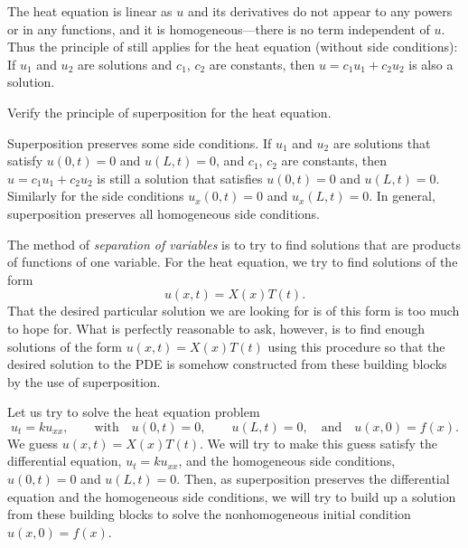 The heat equation is linear as $u$ and its derivatives do not
appear to any powers or in any functions,
and it is homogeneous---there is no term independent of $u$.
Thus the principle of  still applies for
the heat equation
(without side conditions):
If $u_1$ and $u_2$ are
solutions and $c_1$, $c_2$ are constants, then
$u = c_1 u_1 + c_2 u_2$ is also a solution.

\begin{exercise}
Verify the principle of superposition for the heat equation.
\end{exercise}

Superposition preserves some side conditions.
If $u_1$ and $u_2$ are
solutions that satisfy $u(0,t) = 0$ and $u(L,t) = 0$,
and $c_1$, $c_2$ are constants, then
$u = c_1 u_1 + c_2 u_2$ is still a solution
that satisfies $u(0,t) = 0$ and $u(L,t) = 0$.  Similarly
for the side conditions $u_x(0,t) = 0$ and $u_x(L,t) = 0$.  In general,
superposition preserves all homogeneous side conditions.

The method of
\emph{separation of variables} is to
try to find solutions that are products of functions of one variable.
For the heat equation, we try to find solutions of the form
\begin{equation*}
u(x,t) = X(x)T(t) .
\end{equation*}
That the desired particular solution we are looking for is of this form is too much to
hope for.  What is perfectly reasonable to ask, however, is to find
enough  solutions of the form
$u(x,t) = X(x)T(t)$ using this procedure
so that the desired solution to the PDE is somehow constructed from these
building blocks by the use of superposition.

Let us try to solve the heat equation problem
\begin{equation*}
u_t = k u_{xx},
\qquad \text{with} \quad
u(0,t) = 0 ,\quad \quad u(L,t) = 0,
\quad \text{and} \quad u(x,0) = f(x) .
\end{equation*}
We guess $u(x,t) = X(x)T(t)$.  We will try to make this guess satisfy the
differential equation, $u_t = k u_{xx}$, and the homogeneous side conditions,
$u(0,t) = 0$ and $u(L,t) = 0$.  Then, as superposition preserves the
differential equation and the homogeneous side conditions, we will try to
build up a solution from these building blocks to solve the
nonhomogeneous initial condition $u(x,0) = f(x)$.

